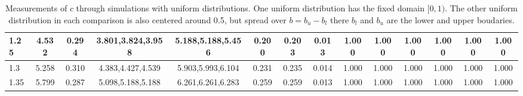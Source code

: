 \begin{table*}[h!]
\begin{center}
\begin{tabular}{| l | c | c | c | c | c | c | c | c | c | c | c | c | c |}
1.25 & 4.532 & 0.294 & 3.801,3.824,3.958 & 5.188,5.188,5.456  & 0.200  & 0.203  & 0.013  & 1.000  & 1.000  & 1.000  & 1.000  & 1.000  & 1.000 \\\hline
1.3 & 5.258 & 0.310 & 4.383,4.427,4.539 & 5.903,5.993,6.104  & 0.231  & 0.235  & 0.014  & 1.000  & 1.000  & 1.000  & 1.000  & 1.000  & 1.000 \\\hline
1.35 & 5.799 & 0.287 & 5.098,5.188,5.188 & 6.261,6.261,6.283  & 0.259  & 0.259  & 0.013  & 1.000  & 1.000  & 1.000  & 1.000  & 1.000  & 1.000 \\\hline
\end{tabular}
\caption{Measurements of $c$ through simulations
        with uniform distributions.
        One uniform distribution has the fixed domain $[0,1)$.
        The other uniform distribution in each comparison
        is also centered around 0.5,
        but spread over $b=b_u-b_l$ there $b_l$ and $b_u$ are the lower and upper boudaries.}
\end{center}
\end{table*}